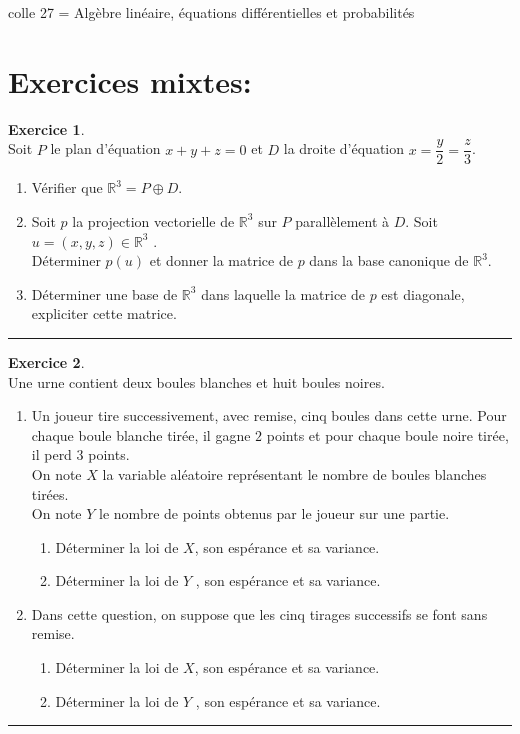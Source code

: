 \documentclass[a4paper,10pt]{article}
\theoremstyle{definition}
\theoremstyle{definition}
\newtheorem{exo}{Exercice}
\newcommand{\R}{\mathbb{R}}
\begin{document}
 	

\begin{center}
\Large \sc colle 27 = Algèbre linéaire, équations différentielles et probabilités
\end{center}

\section*{Exercices mixtes:}%

\raggedright

\begin{exo}\textbf{}\quad\\[0.25cm]
Soit $P$ le plan d’équation $x + y + z = 0$ et $D$ la droite d’équation $x =\dfrac{y}{2} = \dfrac{z}{3} $.
\begin{enumerate}
	\item Vérifier que $\R^3 = P \oplus D$.
	\item Soit $p$ la projection vectorielle de $\R^3$ sur $P$ parallèlement à $D$.
	Soit $u = (x, y, z) \in \R^3$ .\\
	Déterminer $p(u)$ et donner la matrice de $p$ dans la base canonique de $\R^3$.
	\item Déterminer une base de $\R^3$ dans laquelle la matrice de $p$ est diagonale, expliciter cette matrice.
\end{enumerate}

\centering
\rule{1\linewidth}{0.6pt}
\end{exo}

\begin{exo}\textbf{}\quad\\[0.25cm]
Une urne contient deux boules blanches et huit boules noires.\\
\begin{enumerate}
	\item Un joueur tire successivement, avec remise, cinq boules dans cette urne.
	Pour chaque boule blanche tirée, il gagne $2$ points et pour chaque boule noire tirée, il perd $3$ points.\\
	On note $X$ la variable aléatoire représentant le nombre de boules blanches tirées.\\
	On note $Y$ le nombre de points obtenus par le joueur sur une partie.
	\begin{enumerate}
		\item Déterminer la loi de $X$, son espérance et sa variance.
		\item Déterminer la loi de $Y$ , son espérance et sa variance.
	\end{enumerate}
	\item Dans cette question, on suppose que les cinq tirages successifs se font sans remise.
	\begin{enumerate}
		\item Déterminer la loi de $X$, son espérance et sa variance.
		\item Déterminer la loi de $Y$ , son espérance et sa variance.
	\end{enumerate}
\end{enumerate}
\centering
\rule{1\linewidth}{0.6pt}
\end{exo}
\end{document}
